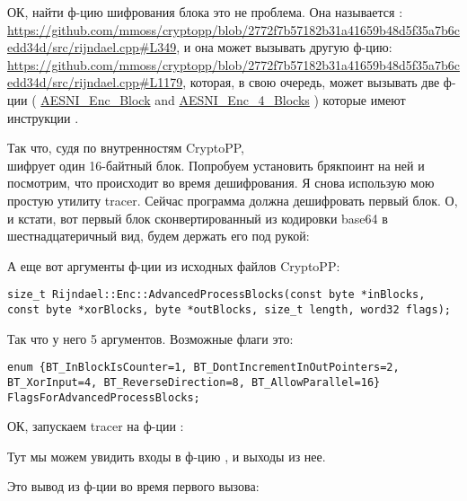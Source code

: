 ОК, найти ф-цию шифрования блока это не проблема.
Она называется :\\
\url{https://github.com/mmoss/cryptopp/blob/2772f7b57182b31a41659b48d5f35a7b6cedd34d/src/rijndael.cpp#L349},
и она может вызывать другую ф-цию: \\
\url{https://github.com/mmoss/cryptopp/blob/2772f7b57182b31a41659b48d5f35a7b6cedd34d/src/rijndael.cpp#L1179},
которая, в свою очередь, может вызывать две ф-ции (
\href{https://github.com/mmoss/cryptopp/blob/2772f7b57182b31a41659b48d5f35a7b6cedd34d/src/rijndael.cpp#L1000}{AESNI\_Enc\_Block}
and
\href{https://github.com/mmoss/cryptopp/blob/2772f7b57182b31a41659b48d5f35a7b6cedd34d/src/rijndael.cpp#L1012}{AESNI\_Enc\_4\_Blocks}
)
которые имеют инструкции .

Так что, судя по внутренностям CryptoPP, \\
 шифрует один 16-байтный блок.
Попробуем установить брякпоинт на ней и посмотрим, что происходит во время дешифрования.
Я снова использую мою простую утилиту tracer.
Сейчас программа должна дешифровать первый блок.
О, и кстати, вот первый блок сконвертированный из кодировки base64 в шестнадцатеричный вид, будем держать его под рукой:



А еще вот аргументы ф-ции из исходных файлов CryptoPP:

\begin{lstlisting}
size_t Rijndael::Enc::AdvancedProcessBlocks(const byte *inBlocks, const byte *xorBlocks, byte *outBlocks, size_t length, word32 flags);
\end{lstlisting}

Так что у него 5 аргументов. Возможные флаги это:

\begin{lstlisting}
enum {BT_InBlockIsCounter=1, BT_DontIncrementInOutPointers=2, BT_XorInput=4, BT_ReverseDirection=8, BT_AllowParallel=16} FlagsForAdvancedProcessBlocks;
\end{lstlisting}

ОК, запускаем tracer на ф-ции :



Тут мы можем увидить входы в ф-цию , и выходы из нее.

Это вывод из ф-ции во время первого вызова:

